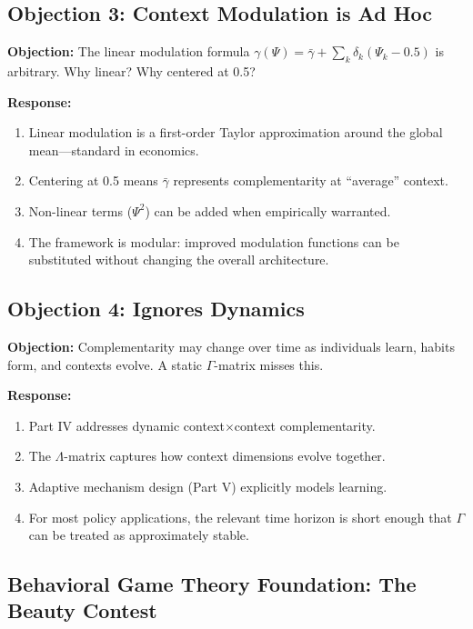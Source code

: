 \subsection{Objection 3: Context Modulation is Ad Hoc}

\textbf{Objection:} The linear modulation formula 
$\gamma(\Psi) = \bar{\gamma} + \sum_k \delta_k (\Psi_k - 0.5)$ is arbitrary. 
Why linear? Why centered at 0.5?

\textbf{Response:}
\begin{enumerate}[nosep]
    \item Linear modulation is a first-order Taylor approximation around 
    the global mean---standard in economics.
    \item Centering at 0.5 means $\bar{\gamma}$ represents complementarity 
    at ``average'' context.
    \item Non-linear terms ($\Psi^2$) can be added when empirically warranted.
    \item The framework is modular: improved modulation functions can be 
    substituted without changing the overall architecture.
\end{enumerate}

\subsection{Objection 4: Ignores Dynamics}

\textbf{Objection:} Complementarity may change over time as individuals learn, 
habits form, and contexts evolve. A static $\Gamma$-matrix misses this.

\textbf{Response:}
\begin{enumerate}[nosep]
    \item Part IV addresses dynamic context$\times$context complementarity.
    \item The $\Lambda$-matrix captures how context dimensions evolve together.
    \item Adaptive mechanism design (Part V) explicitly models learning.
    \item For most policy applications, the relevant time horizon is short 
    enough that $\Gamma$ can be treated as approximately stable.
\end{enumerate}

\subsection{Behavioral Game Theory Foundation: The Beauty Contest}
\label{sec:B-beauty-contest}

